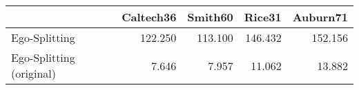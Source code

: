 \begin{tabular}{lrrrr}
\toprule
{} & Caltech36 & Smith60 &  Rice31 & Auburn71 \\
\midrule
Ego-Splitting            &   122.250 & 113.100 & 146.432 &  152.156 \\
Ego-Splitting (original) &     7.646 &   7.957 &  11.062 &   13.882 \\
\bottomrule
\end{tabular}
